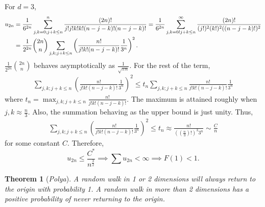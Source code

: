 \documentclass[15pt,a4paper]{book}
\newtheorem{theorem}{Theorem}[chapter]
\theoremstyle{definition}
\newcommand{\eax}[1]{\emph{#1}\index{#1}} %
\begin{document}
For $d = 3$,
\begin{align}
    u_{2n} &= \frac{1}{6^{2n}} \sum_{j,k = 0; j+k \leq n}^{n} \frac{(2n)!}{j! j! k! k! (n-j-k)! (n-j-k)!} = \frac{1}{6^{2n}} \sum_{j,k=0l j+k \leq n}^{\infty} \frac{(2n)!}{(j!)^{2}(k!)^{2}((n-j-k)!)^{2}} \notag \\
    &= \frac{1}{2^{2n}} \binom{2n}{n} \sum_{j,k;j+k \leq n} \left( \frac{n!}{j!k!(n-j-k)!} \frac{1}{3^{n}} \right)^{2}.
\end{align}
$\frac{1}{2^{2n}} \binom{2n}{n}$ behaves asymptotically as $\frac{1}{\sqrt{\pi n}}$. For the rest of the term,
\begin{align}
    \sum_{j,k; j+k \leq n} \left( \frac{n!}{j!k!(n-j-k)!} \frac{1}{3^{n}} \right)^{2} \leq t_{n} \sum_{j,k;j+k \leq n} \frac{n!}{j!k!(n-j-k)!} \frac{1}{3^{n}}
\end{align}
where $t_{n} = \max_{j,k;j+k \leq n} \frac{n!}{j!k!(n-j-k)!}$. The maximum is attained roughly when $j,k \approx \frac{n}{3}$. Also, the summation behaving as the upper bound is just unity. Thus,
\begin{align}
    \sum_{j,k; j+k \leq n} \left( \frac{n!}{j!k!(n-j-k)!} \frac{1}{3^{n}} \right)^{2} \leq t_{n} \approx \frac{n!}{((\frac{n}{3})!)^{3} 3^{n}} \sim \frac{C}{n}
\end{align}
for some constant $C$. Therefore,
\begin{equation}
    u_{2n} \leq \frac{C^{\ast}}{n^{\frac{3}{2}}} \implies \sum u_{2n} < \infty \implies F(1) < 1.
\end{equation}

\begin{theorem}[\eax{Polya}]
    A random walk in 1 or 2 dimensions will always return to the origin with probability 1. A random walk in more than 2 dimensions has a positive probability of never returning to the origin.
\end{theorem}
\end{document}
